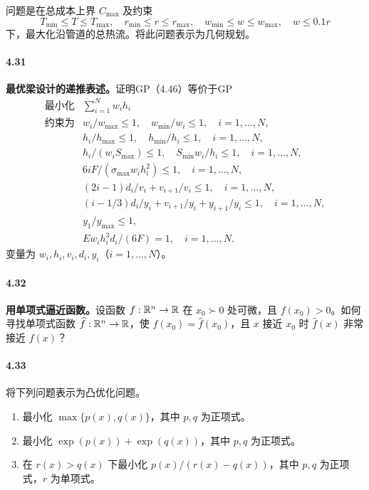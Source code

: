 问题是在总成本上界 $C_{\max}$ 及约束
\[
T_{\min}\le T\le T_{\max},\quad r_{\min}\le r\le r_{\max},\quad
w_{\min}\le w\le w_{\max},\quad w\le0.1r
\]
下，最大化沿管道的总热流。将此问题表示为几何规划。

\paragraph{4.31}\textbf{最优梁设计的递推表述。}证明GP（4.46）等价于GP
\[
\begin{array}{ll}
\text{最小化}&\displaystyle\sum_{i=1}^N w_ih_i\\
\text{约束为}&w_i/w_{\max}\le1,\quad w_{\min}/w_i\le1,\quad i=1,\ldots,N,\\
&h_i/h_{\max}\le1,\quad h_{\min}/h_i\le1,\quad i=1,\ldots,N,\\
&h_i/(w_iS_{\max})\le1,\quad S_{\min}w_i/h_i\le1,\quad i=1,\ldots,N,\\
&6iF/(\sigma_{\max}w_ih_i^2)\le1,\quad i=1,\ldots,N,\\
&(2i-1)d_i/v_i+v_{i+1}/v_i\le1,\quad i=1,\ldots,N,\\
&(i-1/3)d_i/y_i+v_{i+1}/y_i+y_{i+1}/y_i\le1,\quad i=1,\ldots,N,\\
&y_1/y_{\max}\le1,\\
&Ew_ih_i^3d_i/(6F)=1,\quad i=1,\ldots,N.
\end{array}
\]
变量为 $w_i,h_i,v_i,d_i,y_i$（$i=1,\ldots,N$）。

\paragraph{4.32}\textbf{用单项式逼近函数。}设函数 $f:\mathbb R^n\to\mathbb R$ 在 $x_0\succ0$ 处可微，且 $f(x_0)>0$。如何寻找单项式函数 $\widehat f:\mathbb R^n\to\mathbb R$，使 $f(x_0)=\widehat f(x_0)$，且 $x$ 接近 $x_0$ 时 $\widehat f(x)$ 非常接近 $f(x)$？

\paragraph{4.33}将下列问题表示为凸优化问题。
\begin{enumerate}[label=(\alph*)]
\item 最小化 $\max\{p(x),q(x)\}$，其中 $p,q$ 为正项式。
\item 最小化 $\exp(p(x))+\exp(q(x))$，其中 $p,q$ 为正项式。
\item 在 $r(x)>q(x)$ 下最小化 $p(x)/(r(x)-q(x))$，其中 $p,q$ 为正项式，$r$ 为单项式。
\end{enumerate}


